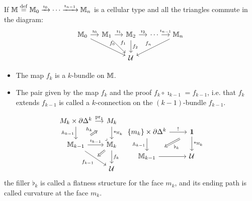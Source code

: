 \documentclass[14pt,aspectratio=169]{beamer}
\renewcommand{\defemph}[1]{\alert{#1}}
\begin{document}
\begin{frame}
\begin{definition}
If \( \mathbb{M}\stackrel{\mathrm{def}}{=} \mathbb{M}_0\xrightarrow[]{\imath_0}\cdots\xrightarrow[]{\imath_{n-1}}\mathbb{M}_n \) is a cellular type and all the triangles commute in the diagram:\vspace{-10pt}
\[\begin{tikzcd}[ampersand replacement=\&, column sep=small]
  {\mm_0} \& {\mm_1} \& {\mm_2} \& \cdots \& {\mm_n} \\
\&\& {\mathcal{U}}
\arrow["{\imath_0}", from=1-1, to=1-2]
\arrow["{f_0}", from=1-1, to=2-3]
\arrow["{\imath_1}", from=1-2, to=1-3]
\arrow["{f_1}", from=1-2, to=2-3]
\arrow["{\imath_2}", from=1-3, to=1-4]
\arrow["{f_2}", from=1-3, to=2-3]
\arrow["{\imath_{n-1}}", from=1-4, to=1-5]
\arrow["f_n"', from=1-5, to=2-3]
\end{tikzcd}\]\vspace{-15pt}
\begin{itemize}
\item The map \( f_k \) is a \defemph{\( k \)-bundle} on \( \mathbb{M} \).
\item The pair given by the map \( f_k \) and the proof \( f_k\circ \imath_{k-1}=f_{k-1} \), i.e. that \( f_k \) extends \( f_{k-1} \) is called a \defemph{\( k \)-connection on the \( (k-1) \)-bundle \( f_{k-1} \)}.
\end{itemize}
\end{definition}
\end{frame}

\begin{frame}
\begin{mydef}
\[\begin{tikzcd}[ampersand replacement=\&, column sep=small]
  {M_k\times \partial\Delta^k} \& {M_k} \\
  {\mathbb{M}_{k-1}} \& {\mathbb{M}_k} \\
  \& {\mathcal{U}}
  \arrow["{\mathrm{pr}_1}", from=1-1, to=1-2]
  \arrow["{\mathbb{A}_{k-1}}"', from=1-1, to=2-1]
  \arrow["{*_{\mathbb{M}_k}}", from=1-2, to=2-2]
  \arrow["{h_k}", shorten <=10pt, shorten >=10pt, Rightarrow, from=2-1, to=1-2]
  \arrow["{\imath_{k-1}}", from=2-1, to=2-2]
  \arrow[""{name=0, anchor=center, inner sep=0}, "{f_{k-1}}"', from=2-1, to=3-2]
  \arrow["\ulcorner"{pos=-0.05, rotate=180}, shift left=1.5, draw=none, from=2-2, to=1-1]
  \arrow["{f_k}", from=2-2, to=3-2]
  \arrow[shorten >=3pt, Rightarrow, from=2-2, to=0]
\end{tikzcd}
\begin{tikzcd}[ampersand replacement=\&]
  {\{m_k\}\times \partial\Delta^k} \& \unit \\
  {\mathbb{M}_{k-1}} \& {\mathcal{U}}
  \arrow["{!}", from=1-1, to=1-2]
  \arrow["{\mathbb{A}_{k-1}}"', from=1-1, to=2-1]
  \arrow["{*_{\mathbb{M}_k}}", from=1-2, to=2-2]
  \arrow["{\flat_k}", shorten <=11pt, shorten >=11pt, Rightarrow, from=1-2, to=2-1]
  \arrow[from=2-1, to=2-2]
\end{tikzcd}\]
the filler \( \flat_k \) is called a \defemph{flatness structure for the face \( m_k \)}, and its ending path is called \defemph{curvature at the face \( m_k \)}.
\end{mydef}
\end{frame}
\end{document}
